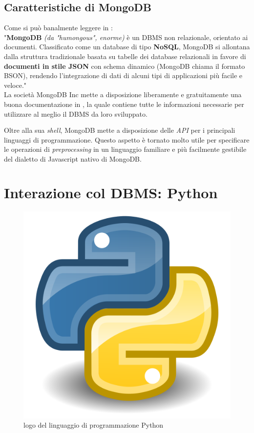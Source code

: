     \subsection{Caratteristiche di MongoDB}

        Come si può banalmente leggere in \cite{mongowiki}: \\
        
        "\textbf{MongoDB} \textit{(da "humongous", enorme)} è un DBMS non relazionale, orientato ai documenti. Classificato come un database di tipo \textbf{NoSQL}, MongoDB si allontana dalla struttura tradizionale basata su tabelle dei database relazionali in favore di \textbf{documenti in stile JSON} con schema dinamico (MongoDB chiama il formato BSON), rendendo l'integrazione di dati di alcuni tipi di applicazioni più facile e veloce." \\

        La società MongoDB Inc mette a disposizione liberamente e gratuitamente una buona documentazione in \cite{mongodb}, la quale contiene tutte le informazioni necessarie per utilizzare al meglio il DBMS da loro sviluppato. 

        Oltre alla sua \textit{shell}, MongoDB mette a disposizione delle \textit{API} per i principali linguaggi di programmazione. Questo aspetto è tornato molto utile per specificare le operazioni di \textit{preprocessing} in un linguaggio familiare e più facilmente gestibile del dialetto di Javascript nativo di MongoDB.

\section{Interazione col DBMS: Python}

    \begin{figure}
        \centering
        \caption{logo del linguaggio di programmazione Python}
        \label{python_logo}
    	\includegraphics[scale=0.1]{img/python.png}
    \end{figure}

